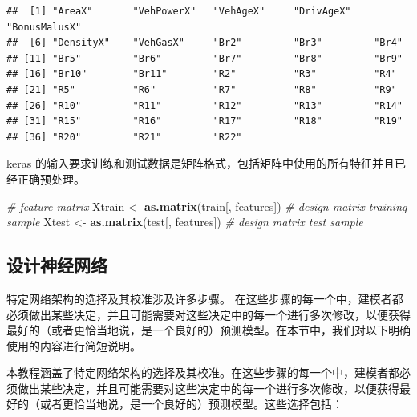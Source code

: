 \documentclass[
]{article}
\newenvironment{Shaded}{\begin{snugshade}}{\end{snugshade}}
\newcommand{\CommentTok}[1]{\textcolor[rgb]{0.56,0.35,0.01}{\textit{#1}}}
\newcommand{\FunctionTok}[1]{\textcolor[rgb]{0.13,0.29,0.53}{\textbf{#1}}}
\newcommand{\NormalTok}[1]{#1}
\newcommand{\OtherTok}[1]{\textcolor[rgb]{0.56,0.35,0.01}{#1}}
\begin{document}
\begin{verbatim}
##  [1] "AreaX"       "VehPowerX"   "VehAgeX"     "DrivAgeX"    "BonusMalusX"
##  [6] "DensityX"    "VehGasX"     "Br2"         "Br3"         "Br4"        
## [11] "Br5"         "Br6"         "Br7"         "Br8"         "Br9"        
## [16] "Br10"        "Br11"        "R2"          "R3"          "R4"         
## [21] "R5"          "R6"          "R7"          "R8"          "R9"         
## [26] "R10"         "R11"         "R12"         "R13"         "R14"        
## [31] "R15"         "R16"         "R17"         "R18"         "R19"        
## [36] "R20"         "R21"         "R22"
\end{verbatim}

keras
的输入要求训练和测试数据是矩阵格式，包括矩阵中使用的所有特征并且已经正确预处理。

\begin{Shaded}
\begin{Highlighting}[]
\CommentTok{\# feature matrix}
\NormalTok{Xtrain }\OtherTok{\textless{}{-}} \FunctionTok{as.matrix}\NormalTok{(train[, features])  }\CommentTok{\# design matrix training sample}
\NormalTok{Xtest }\OtherTok{\textless{}{-}} \FunctionTok{as.matrix}\NormalTok{(test[, features])    }\CommentTok{\# design matrix test sample}
\end{Highlighting}
\end{Shaded}

\subsection{设计神经网络}\label{ux8bbeux8ba1ux795eux7ecfux7f51ux7edc}

特定网络架构的选择及其校准涉及许多步骤。
在这些步骤的每一个中，建模者都必须做出某些决定，并且可能需要对这些决定中的每一个进行多次修改，以便获得最好的（或者更恰当地说，是一个良好的）预测模型。在本节中，我们对以下明确使用的内容进行简短说明。

本教程涵盖了特定网络架构的选择及其校准。在这些步骤的每一个中，建模者都必须做出某些决定，并且可能需要对这些决定中的每一个进行多次修改，以便获得最好的（或者更恰当地说，是一个良好的）预测模型。这些选择包括：
\end{document}

